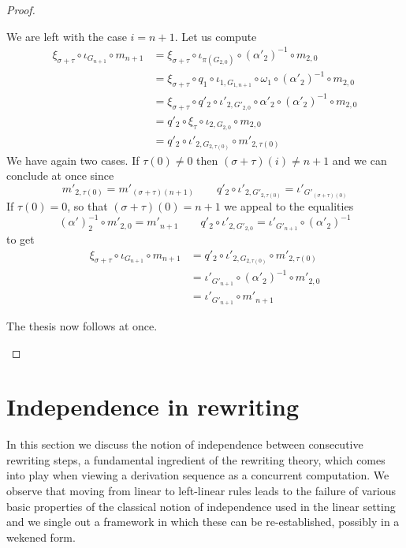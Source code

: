 \documentclass[a4paper,UKenglish,cleveref,pdftex, thm-restate,numberwithinsect,anonymous]{lipics}
\begin{document}
\begin{proof}
\begin{itemize}
\begin{itemize}
      We are left with the case $i=n+1$. Let us compute
      \begin{align*}
        \xi_{\sigma+\tau}\circ \iota_{G_{n+1}} \circ m_{n+1} & = \xi_{\sigma+\tau} \circ \iota_{\pi(G_{2,0})} \circ (\alpha'_2)^{-1}\circ m_{2,0} \\&=\xi_{\sigma+\tau} \circ q_1\circ \iota_{1, G_{1,n+1}} \circ \omega_1 \circ (\alpha'_2)^{-1}\circ m_{2,0}\\&=\xi_{\sigma+\tau} \circ q'_2 \circ \iota'_{2,G'_{2,0}} \circ \alpha'_2 \circ (\alpha'_2)^{-1}\circ m_{2,0} \\&=q'_2 \circ \xi_\tau \circ \iota_{2, G_{2,0}} \circ m_{2,0}\\&=q'_2\circ \iota'_{2, G_{2,\tau(0)}} \circ m'_{2,\tau(0)}
      \end{align*}
      We have again two cases. If $\tau(0)\neq 0$ then $(\sigma+\tau)(i)\neq n+1$ and we can conclude at once since
      \[m'_{2, \tau(0)}=m'_{(\sigma+\tau)(n+1)} \qquad q'_2\circ \iota'_{2, G'_{2,\tau(0)}}=
        \iota'_{G'_{(\sigma+\tau)(0)}}\]
      If $\tau(0)=0$, so that  $(\sigma+\tau)(0)= n+1$ we appeal to the equalities
      \[(\alpha')^{-1}_2\circ m'_{2, 0}=m'_{n+1} \qquad q'_2\circ \iota'_{2, G'_{2, 0}}=
        \iota'_{G'_{n+1}}\circ (\alpha'_2)^{-1}\]
      to get
      \begin{align*}
        \xi_{\sigma+\tau}\circ \iota_{G_{n+1}} \circ m_{n+1} & = q'_2\circ \iota'_{2, G_{2,\tau(0)}} \circ m'_{2,\tau(0)} \\&=	\iota'_{G'_{n+1}}\circ (\alpha'_2)^{-1}\circ m'_{2,0}\\&=\iota'_{G'_{n+1}}\circ  m'_{n+1}
      \end{align*}
    \end{itemize}
    The thesis now follows at once.	 \qedhere
  \end{itemize} \end{proof}
\fi




\section{Independence in rewriting}
\label{sec:equi}

In this section we discuss the notion of independence between
consecutive rewriting steps, a fundamental ingredient of the rewriting
theory, which comes into play when viewing a derivation sequence as a
concurrent computation. We observe that moving from linear to
left-linear rules leads to the failure of various basic properties of
the classical notion of independence used in the linear setting and we
single out a framework in which these can be re-established, possibly
in a wekened form.
\end{document}
